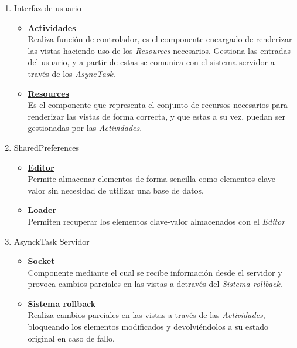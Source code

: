 \documentclass[12pt]{article}
\begin{document}
            \begin{enumerate}
                \item Interfaz de usuario
                    \begin{itemize}
                        \item \textbf{\underline{Actividades}} \\
                            Realiza función de controlador, es el componente encargado de renderizar las vistas haciendo uso de los \textit{Resources} necesarios. Gestiona las entradas del usuario, y a partir de estas se comunica con el sistema servidor a través de los \textit{AsyncTask}.
                        \item \textbf{\underline{Resources}} \\ 
                            Es el componente que representa el conjunto de recursos necesarios para renderizar las vistas de forma correcta, y que estas a su vez, puedan ser gestionadas por las \textit{Actividades}.
                    \end{itemize}
                \item SharedPreferences
                    \begin{itemize}
                        \item \textbf{\underline{Editor}} \\ 
                            Permite almacenar elementos de forma sencilla como elementos clave-valor sin necesidad de utilizar una base de datos.
                        \item \textbf{\underline{Loader}} \\
                            Permiten recuperar los elementos clave-valor almacenados con el \textit{Editor}
                    \end{itemize}
                \item AsynckTask Servidor
                    \begin{itemize}
                        \item \textbf{\underline{Socket}} \\ 
                            Componente mediante el cual se recibe información desde el servidor y provoca cambios parciales en las vistas a detravés del \textit{Sistema rollback}.
                        \item \textbf{\underline{Sistema rollback}} \\
                            Realiza cambios parciales en las vistas a través de las \textit{Actividades}, bloqueando los elementos modificados y devolviéndolos a su estado original en caso de fallo.

\end{itemize}
\end{enumerate}
\end{document}

